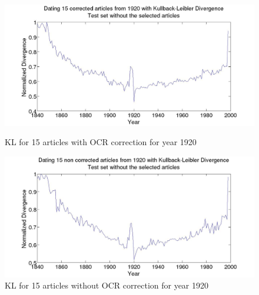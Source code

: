 \begin{figure}[H]
    \begin{minipage}[b]{0.48\linewidth}
        \includegraphics[scale=0.15]{Pictures/date_articles/kullback_leibler/15articles_1920_KL_years_simulate_articles_corrected_without_articles.jpg}
        \caption{KL for 15 articles with OCR correction for year 1920}
        \label{ArticleKL-C1920}
    \end{minipage}\hfill
    \begin{minipage}[b]{0.5\linewidth}
        \includegraphics[scale=0.15]{Pictures/date_articles/kullback_leibler/15articles_1920_KL_years_simulate_articles_without_correction_without_articles.jpg}
        \caption{KL for 15 articles without OCR correction for year 1920}
        \label{ArticleKL-N1920}
    \end{minipage}\hfill
\end{figure}

